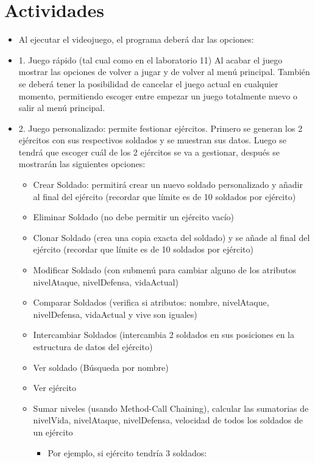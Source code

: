 	\section{Actividades}
	\begin{itemize}		
      \item Al ejecutar el videojuego, el programa deberá dar las opciones:
      \item 1. Juego rápido (tal cual como en el laboratorio 11)
Al acabar el juego mostrar las opciones de volver a jugar y de volver al
menú principal. También se deberá tener la posibilidad de cancelar el
juego actual en cualquier momento, permitiendo escoger entre empezar
un juego totalmente nuevo o salir al menú principal.
      \item 2. Juego personalizado: permite festionar ejércitos. Primero se generan los 2 ejércitos con sus respectivos soldados y se muestran sus datos. Luego se tendrá que escoger cuál de los 2 ejércitos se va a gestionar, después se mostrarán las siguientes opciones:
        \begin{itemize}
          \item Crear Soldado: permitirá crear un nuevo soldado personalizado
y añadir al final del ejército (recordar que límite es de 10
soldados por ejército)
          \item Eliminar Soldado (no debe permitir un ejército vacío)
          \item Clonar Soldado (crea una copia exacta del soldado) y se añade
al final del ejército (recordar que límite es de 10 soldados por
ejército)
          \item Modificar Soldado (con submenú para cambiar alguno de los
atributos nivelAtaque, nivelDefensa, vidaActual)
          \item Comparar Soldados (verifica si atributos: nombre, nivelAtaque,
nivelDefensa, vidaActual y vive son iguales)
          \item Intercambiar Soldados (intercambia 2 soldados en sus posiciones
en la estructura de datos del ejército)
          \item Ver soldado (Búsqueda por nombre)
          \item Ver ejército
          \item Sumar niveles (usando Method-Call Chaining), calcular las
sumatorias de nivelVida, nivelAtaque, nivelDefensa, velocidad de
todos los soldados de un ejército 
            \begin{itemize}
              \item Por ejemplo, si ejército tendría 3 soldados:

\end{itemize}
\end{itemize}
\end{itemize}
